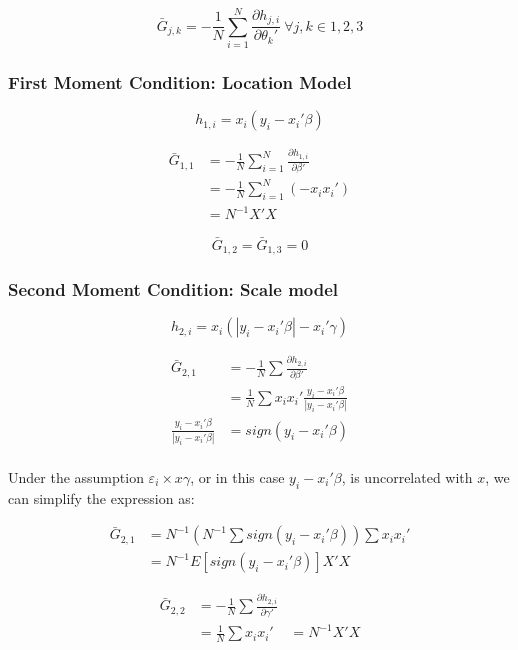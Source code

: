 \documentclass[
  authoryear,
  preprint,
  1p]{elsarticle}
\begin{document}
\[\bar G_{j,k} = - \frac 1 N \sum_{i=1}^N \frac{\partial h_{j,i}}{\partial \theta_k'} \ \forall j,k \in 1,2,3
\]

\hypertarget{first-moment-condition-location-model}{%
\subsubsection{First Moment Condition: Location
Model}\label{first-moment-condition-location-model}}

\[h_{1,i}=x_i(y_i-x_i'\beta)\]

\[\begin{aligned}
\bar G_{1,1} &=- \frac{1}{N} \sum_{i=1}^N \frac{\partial h_{1,i}}{\partial \beta'} \\
             &=- \frac{1}{N} \sum_{i=1}^N (-x_i x_i') \\
             &= N^{-1} X'X
\end{aligned}
\]

\[
\bar G_{1,2} = \bar G_{1,3} = 0
\]

\hypertarget{second-moment-condition-scale-model}{%
\subsubsection{Second Moment Condition: Scale
model}\label{second-moment-condition-scale-model}}

\[h_{2,i}=x_i(|y_i-x_i'\beta|-x_i'\gamma)\]

\[\begin{aligned}
\bar G_{2,1} &= -\frac{1}{N} \sum \frac{\partial h_{2,i}}{\partial \beta'} \\
             &=  \frac{1}{N} \sum x_i x_i' \frac{y_i-x_i'\beta}{|y_i-x_i'\beta|} \\
\frac{y_i-x_i'\beta}{|y_i-x_i'\beta|} &= sign(y_i-x_i'\beta) \\            
\end{aligned}
\]

Under the assumption \(\varepsilon_i \times x\gamma\), or in this case
\(y_i-x_i'\beta\), is uncorrelated with \(x\), we can simplify the
expression as:

\[\begin{aligned}
\bar G_{2,1} &= N^{-1} \left(N^{-1}\sum sign(y_i-x_i'\beta)\right) \sum x_i x_i' \\
&= N^{-1} E[sign(y_i-x_i'\beta)] X'X
\end{aligned}
\]

\[\begin{aligned}
\bar G_{2,2} &= -\frac{1}{N} \sum \frac{\partial h_{2,i}}{\partial \gamma'} \\
             &=  \frac{1}{N} \sum x_i x_i' 
             &= N^{-1} X'X
\end{aligned}
\]
\end{document}
